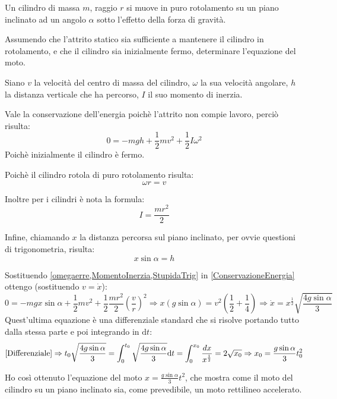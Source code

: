 \documentclass[../main.tex]{subfiles}
\begin{document}
{
Un cilindro di massa $m$, raggio $r$ si muove in puro rotolamento su un piano inclinato
ad un angolo $\alpha$ sotto l'effetto della forza di gravità.

Assumendo che l'attrito statico sia sufficiente a mantenere il cilindro in rotolamento, e che il cilindro sia inizialmente
fermo, determinare l'equazione del moto.
}
{
Siano $v$ la velocità del centro di massa del cilindro, $\omega$ la sua velocità angolare,
$h$ la distanza verticale che ha percorso, $I$ il suo momento di inerzia.

Vale la conservazione dell'energia poichè l'attrito non compie lavoro, perciò risulta:
\begin{equation}\label{ConservazioneEnergia}
	0=-mgh+\frac12mv^2+\frac12 I \omega^2
\end{equation}
Poichè inizialmente il cilindro è fermo.

Poichè il cilindro rotola di puro rotolamento risulta:
\begin{equation}\label{omegaerre}
	\omega r=v
\end{equation}

Inoltre per i cilindri è nota la formula:
\begin{equation}\label{MomentoInerzia}
	I=\frac{mr^2}2
\end{equation}

Infine, chiamando $x$ la distanza percorsa sul piano inclinato, per ovvie questioni di trigonometria, risulta:
\begin{equation}\label{StupidaTrig}
	x\sin{\alpha}=h
\end{equation}

Sostituendo \cref{omegaerre,MomentoInerzia,StupidaTrig} in \cref{ConservazioneEnergia} ottengo (sostituendo $v=\dot x$):
\begin{equation}\label{Differenziale}
	0=-mgx\sin{\alpha}+\frac12mv^2+\frac12 \frac{mr^2}2\left(\frac vr\right)^2 \Rightarrow x\left(g\sin{\alpha}\right)=v^2\left(\frac12+\frac14\right)
	\Rightarrow \dot{x}=x^{\frac12}\sqrt{\frac{4g\sin{\alpha}}3}
\end{equation}
Quest'ultima equazione è una differenziale standard che si risolve portando tutto dalla stessa parte e poi integrando in 
$\mathrm{d}t$:
\begin{equation*}
	\cref{Differenziale}\Rightarrow t_0\sqrt{\frac{4g\sin{\alpha}}3}=\int_0^{t_0}\sqrt{\frac{4g\sin{\alpha}}3}\mathrm{d}t=
	\int_0^{x_0} \frac{dx}{ x^{\frac12} }=2\sqrt{x_0}\Rightarrow x_0=\frac{g\sin{\alpha}}3t_0^2
\end{equation*}

Ho così ottenuto l'equazione del moto $x=\frac{g\sin{\alpha}}3t^2$, che mostra come il moto del cilindro su un 
piano inclinato sia, come prevedibile, un moto rettilineo accelerato.
}
\end{document}
